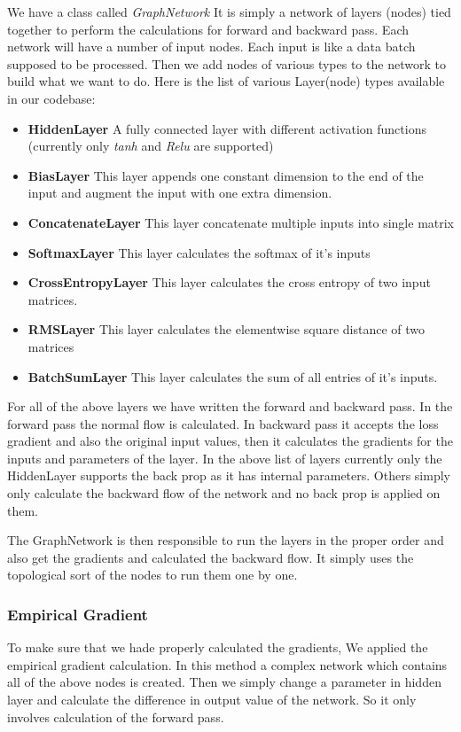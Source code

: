 We have a class called \textit{GraphNetwork} It is simply a network of layers (nodes) tied together to perform the calculations for forward and backward pass. Each network will have a number of input nodes. Each input is like a data batch supposed to be processed.  Then we add nodes of various types to the network to build what we want to do. Here is the list of various Layer(node) types available in our codebase: 
\begin{itemize}
    \item \textbf{HiddenLayer} A fully connected layer with different activation functions (currently only \textit{tanh} and \textit{Relu} are supported)
    \item \textbf{BiasLayer} This layer appends one constant dimension to the end of the input and augment the input with one extra dimension. 
    \item \textbf{ConcatenateLayer} This layer concatenate multiple inputs into single matrix 
    \item \textbf{SoftmaxLayer}  This layer calculates the softmax of it's inputs 
    \item \textbf{CrossEntropyLayer} This layer calculates the cross entropy of two input matrices.  
    \item \textbf{RMSLayer} This layer calculates the elementwise square distance of two matrices
    \item \textbf{BatchSumLayer} This layer calculates the sum of all entries of it's inputs. 
\end{itemize}

For all of the above layers we have written the forward and backward pass. In the forward pass the normal flow is calculated. In backward pass it accepts the loss gradient and also the original input values, then it calculates the gradients for the inputs and parameters of the layer.  In the above list of layers currently only the HiddenLayer supports the back prop as it has internal parameters. Others simply only calculate the backward flow of the network and no back prop is applied on them. 


The GraphNetwork is then responsible to run the layers in the proper order and also get the gradients and calculated the backward flow.  It simply uses the topological sort of the nodes to run them one by one.  
\subsubsection{Empirical Gradient}
To make sure that we hade properly calculated the gradients,  We applied the empirical gradient calculation. In this method a complex network which contains all of the above nodes is created. Then we simply change a parameter in hidden layer and calculate the difference in output value of the network. So it only involves calculation of the forward pass.

